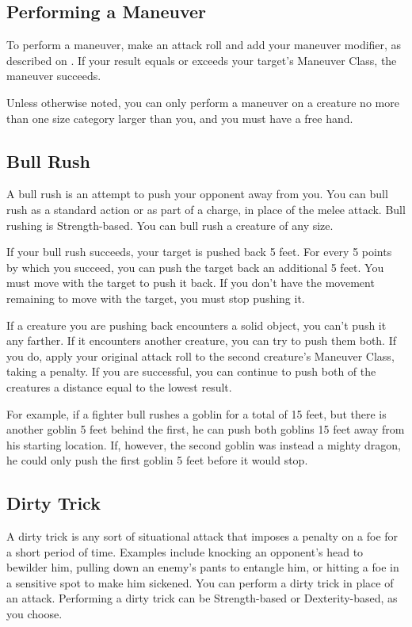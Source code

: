 \subsection{Performing a Maneuver}
To perform a maneuver, make an attack roll and add your maneuver modifier, as described on . If your result equals or exceeds your target's Maneuver Class, the maneuver succeeds.

Unless otherwise noted, you can only perform a maneuver on a creature no more than one size category larger than you, and you must have a free hand.

\subsection{Bull Rush}\label{Bull Rush}
A bull rush is an attempt to push your opponent away from you. You can bull rush as a standard action or as part of a charge, in place of the melee attack. Bull rushing is Strength-based. You can bull rush a creature of any size.

If your bull rush succeeds, your target is pushed back 5 feet. For every 5 points by which you succeed, you can push the target back an additional 5 feet. You must move with the target to push it back. If you don't have the movement remaining to move with the target, you must stop pushing it.

If a creature you are pushing back encounters a solid object, you can't push it any farther. If it encounters another creature, you can try to push them both. If you do, apply your original attack roll to the second creature's Maneuver Class, taking a  penalty. If you are successful, you can continue to push both of the creatures a distance equal to the lowest result.

For example, if a fighter bull rushes a goblin for a total of 15 feet, but there is another goblin 5 feet behind the first, he can push both goblins 15 feet away from his starting location. If, however, the second goblin was instead a mighty dragon, he could only push the first goblin 5 feet before it would stop.

\subsection{Dirty Trick}\label{Dirty Trick}
A dirty trick is any sort of situational attack that imposes a penalty on a foe for a short period of time. Examples include knocking an opponent's head to bewilder him, pulling down an enemy's pants to entangle him, or hitting a foe in a sensitive spot to make him sickened. You can perform a dirty trick in place of an attack. Performing a dirty trick can be Strength-based or Dexterity-based, as you choose.

